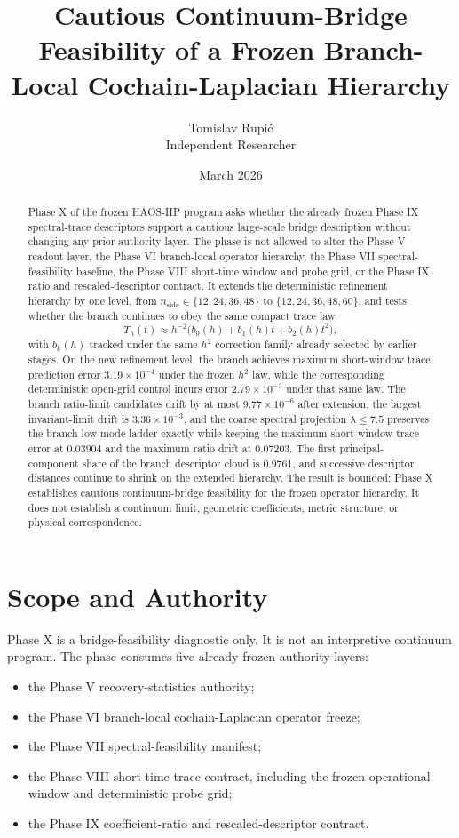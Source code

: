 \documentclass[11pt]{article}
\title{Cautious Continuum-Bridge Feasibility of a Frozen Branch-Local Cochain-Laplacian Hierarchy}
\author{Tomislav Rupi\'c \\ Independent Researcher}
\date{March 2026}
\begin{document}
\maketitle

\begin{abstract}
Phase X of the frozen HAOS-IIP program asks whether the already frozen Phase IX spectral-trace descriptors support a cautious large-scale bridge description without changing any prior authority layer. The phase is not allowed to alter the Phase V readout layer, the Phase VI branch-local operator hierarchy, the Phase VII spectral-feasibility baseline, the Phase VIII short-time window and probe grid, or the Phase IX ratio and rescaled-descriptor contract. It extends the deterministic refinement hierarchy by one level, from $n_{\mathrm{side}} \in \{12,24,36,48\}$ to $\{12,24,36,48,60\}$, and tests whether the branch continues to obey the same compact trace law
\[
T_h(t) \approx h^{-2}\bigl(b_0(h) + b_1(h)t + b_2(h)t^2\bigr),
\]
with $b_k(h)$ tracked under the same $h^2$ correction family already selected by earlier stages. On the new refinement level, the branch achieves maximum short-window trace prediction error $3.19 \times 10^{-4}$ under the frozen $h^2$ law, while the corresponding deterministic open-grid control incurs error $2.79 \times 10^{-3}$ under that same law. The branch ratio-limit candidates drift by at most $9.77 \times 10^{-6}$ after extension, the largest invariant-limit drift is $3.36 \times 10^{-3}$, and the coarse spectral projection $\lambda \le 7.5$ preserves the branch low-mode ladder exactly while keeping the maximum short-window trace error at $0.03904$ and the maximum ratio drift at $0.07203$. The first principal-component share of the branch descriptor cloud is $0.9761$, and successive descriptor distances continue to shrink on the extended hierarchy. The result is bounded: Phase X establishes cautious continuum-bridge feasibility for the frozen operator hierarchy. It does not establish a continuum limit, geometric coefficients, metric structure, or physical correspondence.
\end{abstract}

\section{Scope and Authority}

Phase X is a bridge-feasibility diagnostic only. It is not an interpretive continuum program. The phase consumes five already frozen authority layers:
\begin{itemize}
\item the Phase V recovery-statistics authority;
\item the Phase VI branch-local cochain-Laplacian operator freeze;
\item the Phase VII spectral-feasibility manifest;
\item the Phase VIII short-time trace contract, including the frozen operational window and deterministic probe grid;
\item the Phase IX coefficient-ratio and rescaled-descriptor contract.
\end{itemize}
\end{document}
